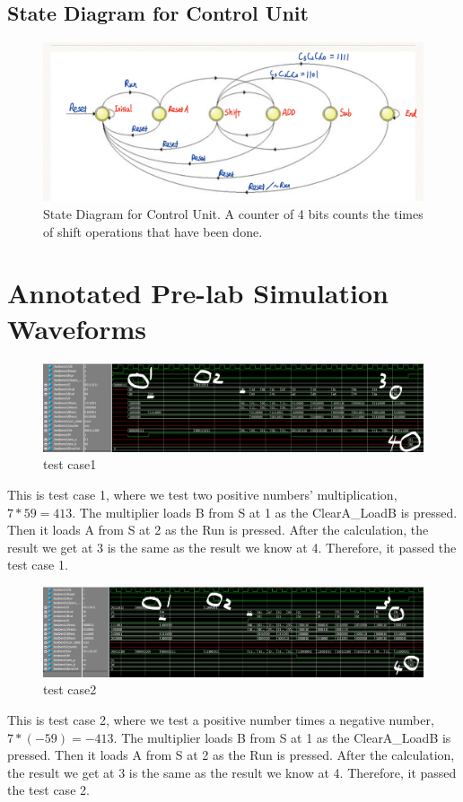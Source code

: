 \documentclass[12pt]{article}
\begin{document}
\subsection{State Diagram for Control Unit}
\begin{figure}[H]
    \centering
    \includegraphics[width=15cm]{state_diagram.png}
    \caption{State Diagram for Control Unit. A counter of 4 bits counts the times of shift operations that have been done. }
\end{figure}

\section{Annotated Pre-lab Simulation Waveforms}
\begin{figure}[H]
    \centering
    \includegraphics[width=18cm]{case1.jpg}
    \caption{test case1}
\end{figure}
This is test case 1, where we test two positive numbers' multiplication, $7*59=413$. The multiplier loads B from S at 1 as the ClearA\_LoadB is pressed. Then it loads A from S at 2 as the Run is pressed. After the calculation, the result we get at 3 is the same as the result we know at 4. Therefore, it passed the test case 1.

\begin{figure}[H]
    \centering
    \includegraphics[width=18cm]{case2.jpg}
    \caption{test case2}
\end{figure}
This is test case 2, where we test a positive number times a negative number, $7*(-59)=-413$. The multiplier loads B from S at 1 as the ClearA\_LoadB is pressed. Then it loads A from S at 2 as the Run is pressed. After the calculation, the result we get at 3 is the same as the result we know at 4. Therefore, it passed the test case 2.
\end{document}

